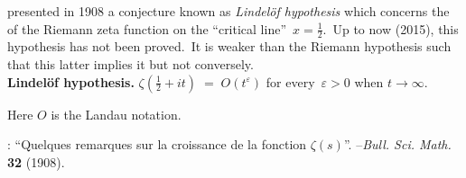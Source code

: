 \documentclass[12pt]{article}
\theoremstyle{definition}
\begin{document}
 presented in 1908 a
conjecture known as \emph{Lindel\"of hypothesis} which concerns 
the  of the Riemann zeta function on the 
``critical line''\, $x = \frac{1}{2}$.\, Up to now (2015), this 
hypothesis has not been proved.\, It is weaker than the Riemann hypothesis such that this latter implies it but not conversely.\\

\textbf{Lindel\"of hypothesis.}\; $\zeta(\frac{1}{2}\!+\!it) 
\;=\; O(t^\varepsilon)$\; for every\, $\varepsilon > 0$\; when\; 
$t \to \infty$.

Here $O$ is the Landau 
 notation.



\begin{thebibliography}{8}
: ``Quelques remarques sur 
la croissance de la fonction $\zeta(s)$''. --\emph{Bull. Sci. Math.} \textbf{32} (1908).
\end{thebibliography}
\end{document}
